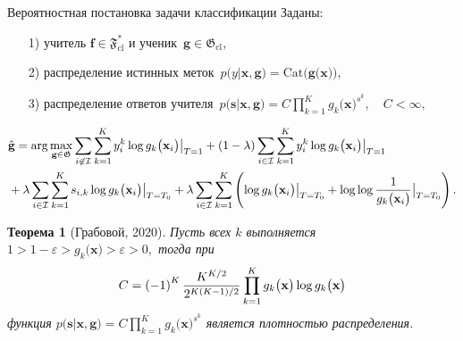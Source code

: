 \documentclass[10pt,pdf,hyperref={unicode}]{beamer}
\newtheorem{rustheorem}{Теорема}
\begin{document}
\begin{frame}{Вероятностная постановка задачи классификации}
\justifying
Заданы:
\begin{enumerate}
	\item[1)] учитель $\textbf{f}\in\mathfrak{F}_{\text{cl}}^{*}$ и ученик~$\textbf{g}\in\mathfrak{G}_{\text{cl}}$,
	\item[2)] распределение истинных меток~$p\bigr(y|\textbf{x}, \textbf{g}\bigr) = \text{Cat}\bigr(\textbf{g}\bigr(\textbf{x}\bigr)\bigr)$,
	\item[3)] распределение ответов учителя~$p\bigr(\textbf{s}|\textbf{x}, \textbf{g}\bigr) = C\prod_{k=1}^{K}g_k\bigr(\textbf{x}\bigr)^{s^k}, \quad C < \infty,$
\end{enumerate}
\[
\setlength\abovedisplayskip{0pt}
\begin{aligned}
&\hat{\textbf{g}} = \arg\max_{\textbf{g}\in \mathfrak{G}} \sum_{i\not\in \mathcal{I}}\sum_{k=1}^{K}y_i^k\log g_k\bigr(\textbf{x}_i\bigr)\bigr|_{T=1} 
+ \left(1-\lambda\right)\sum_{i\in \mathcal{I}}\sum_{k=1}^{K}y_i^k\log g_k\bigr(\textbf{x}_i\bigr)\bigr|_{T=1} \\
&+ \lambda\sum_{i\in \mathcal{I}}\sum_{k=1}^{K}s_{i,k}\log g_k\bigr(\textbf{x}_i\bigr)\bigr|_{T=T_0} 
+ \lambda \sum_{i\in \mathcal{I}}\sum_{k=1}^{K}\left(\log g_k\bigr(\textbf{x}_i\bigr)\bigr|_{T=T_0} + \log\log\frac{1}{g_k\bigr(\textbf{x}_i\bigr)}\bigr|_{T=T_0}\right).
\end{aligned}
\setlength\belowdisplayskip{0pt}
\]

\begin{rustheorem}[Грабовой, 2020]
\label{theorem:st:dist}
Пусть всех $k$ выполняется $1 > 1- \varepsilon > g_k\bigr(\textbf{x}\bigr) > \varepsilon > 0,$ тогда при
\[
\setlength\abovedisplayskip{0pt}
C=\left(-1\right)^{K}\frac{K^{K/2}}{2^{K(K-1)/2}}\prod_{k=1}^{K}g_k\bigr(\textbf{x}\bigr)\log g_k\bigr(\textbf{x}\bigr)
\setlength\belowdisplayskip{0pt}
\]
функция $p\bigr(\textbf{s}|\textbf{x}, \textbf{g}\bigr) = C\prod_{k=1}^{K}g_k\bigr(\textbf{x}\bigr)^{s^k}$ является плотностью распределения.
\end{rustheorem}

\end{frame}
\end{document}
